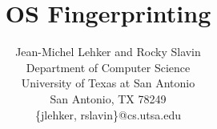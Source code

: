 \documentclass[11pt]{article}
\begin{document}
\title{OS Fingerprinting}

\author{Jean-Michel Lehker and Rocky Slavin\\
        Department of Computer Science\\
        University of Texas at San Antonio\\
        San Antonio, TX 78249\\
        \{jlehker, rslavin\}@cs.utsa.edu}

\date{ }
\maketitle 















\end{document}
